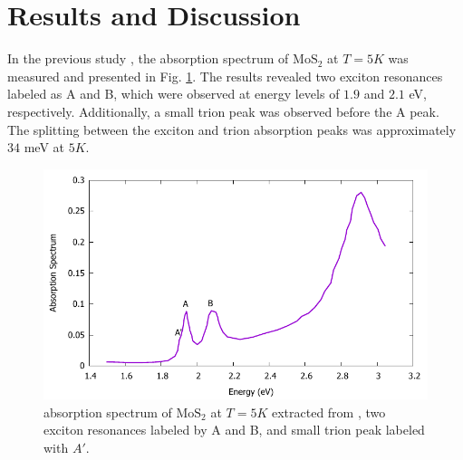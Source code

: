 \documentclass[12pt,english,a4paper]{article}
\begin{document}

\newpage
\section{Results and Discussion}
\quad In the previous study \cite{zhang_absorption_2014}, the absorption spectrum of $\mathrm{MoS}_2$ at $T = 5K$ was measured and presented in Fig. \ref{Absorpt Ex.}. The results revealed two exciton resonances labeled as A and B, which were observed at energy levels of $1.9$ and $2.1$ eV, respectively. Additionally, a small trion peak was observed before the A peak. The splitting between the exciton and trion absorption peaks was approximately $34$ meV at $5K$.\\
\begin{figure}
	\begin{center}
		\includegraphics[width=0.75\linewidth]{images/experiment.pdf}
		\caption[absorption spectrum of $\mathrm{MoS}_2$]{absorption spectrum of $\mathrm{MoS}_2$ at $T=5K$  extracted from \cite{zhang_absorption_2014}, two exciton resonances labeled by A and B, and small trion peak labeled with $A'$.}
		\label{Absorpt Ex.}
	\end{center}
\end{figure}\null
\end{document}
